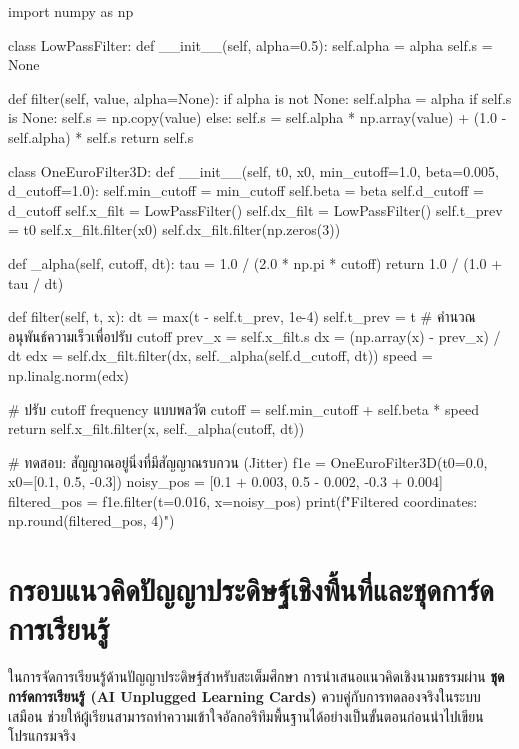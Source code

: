 \begin{codebox}
import numpy as np

class LowPassFilter:
    def __init__(self, alpha=0.5):
        self.alpha = alpha
        self.s = None

    def filter(self, value, alpha=None):
        if alpha is not None:
            self.alpha = alpha
        if self.s is None:
            self.s = np.copy(value)
        else:
            self.s = self.alpha * np.array(value) + (1.0 - self.alpha) * self.s
        return self.s

class OneEuroFilter3D:
    def __init__(self, t0, x0, min_cutoff=1.0, beta=0.005, d_cutoff=1.0):
        self.min_cutoff = min_cutoff
        self.beta = beta
        self.d_cutoff = d_cutoff
        self.x_filt = LowPassFilter()
        self.dx_filt = LowPassFilter()
        self.t_prev = t0
        self.x_filt.filter(x0)
        self.dx_filt.filter(np.zeros(3))

    def _alpha(self, cutoff, dt):
        tau = 1.0 / (2.0 * np.pi * cutoff)
        return 1.0 / (1.0 + tau / dt)

    def filter(self, t, x):
        dt = max(t - self.t_prev, 1e-4)
        self.t_prev = t
        # คำนวณอนุพันธ์ความเร็วเพื่อปรับ cutoff
        prev_x = self.x_filt.s
        dx = (np.array(x) - prev_x) / dt
        edx = self.dx_filt.filter(dx, self._alpha(self.d_cutoff, dt))
        speed = np.linalg.norm(edx)
        
        # ปรับ cutoff frequency แบบพลวัต
        cutoff = self.min_cutoff + self.beta * speed
        return self.x_filt.filter(x, self._alpha(cutoff, dt))

# ทดสอบ: สัญญาณอยู่นิ่งที่มีสัญญาณรบกวน (Jitter)
f1e = OneEuroFilter3D(t0=0.0, x0=[0.1, 0.5, -0.3])
noisy_pos = [0.1 + 0.003, 0.5 - 0.002, -0.3 + 0.004]
filtered_pos = f1e.filter(t=0.016, x=noisy_pos)
print(f"Filtered coordinates: {np.round(filtered_pos, 4)}")
\end{codebox}

\section{กรอบแนวคิดปัญญาประดิษฐ์เชิงพื้นที่และชุดการ์ดการเรียนรู้}

ในการจัดการเรียนรู้ด้านปัญญาประดิษฐ์สำหรับสะเต็มศึกษา การนำเสนอแนวคิดเชิงนามธรรมผ่าน \textbf{ชุดการ์ดการเรียนรู้ (AI Unplugged Learning Cards)} ควบคู่กับการทดลองจริงในระบบเสมือน ช่วยให้ผู้เรียนสามารถทำความเข้าใจอัลกอริทึมพื้นฐานได้อย่างเป็นขั้นตอนก่อนนำไปเขียนโปรแกรมจริง

